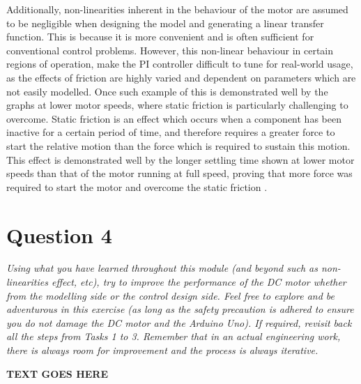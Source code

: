\documentclass[11pt, onecolumn]{article}
\begin{document}
\par Additionally, non-linearities inherent in the behaviour of the motor are assumed to be negligible when designing the model and generating a linear transfer function. This is because it is more convenient and is often sufficient for conventional control problems. However, this non-linear behaviour in certain regions of operation, make the PI controller difficult to tune for real-world usage, as the effects of friction are highly varied and dependent on parameters which are not easily modelled. Once such example of this is demonstrated well by the graphs at lower motor speeds, where static friction is particularly challenging to overcome. Static friction is an effect which occurs when a component has been inactive for a certain period of time, and therefore requires a greater force to start the relative motion than the force which is required to sustain this motion. This effect is demonstrated well by the longer settling time shown at lower motor speeds than that of the motor running at full speed, proving that more force was required to start the motor and overcome the static friction \cite{ijsrpStudyNonlinear}.
\section*{Question 4}
\par \textit{Using what you have learned throughout this module (and beyond such as non- linearities effect, etc), try to improve the performance of the DC motor whether from the modelling side or the control design side. Feel free to explore and be adventurous in this exercise (as long as the safety precaution is adhered to ensure you do not damage the DC motor and the Arduino Uno). If required, revisit back all the steps from Tasks 1 to 3. Remember that in an actual engineering work, there is always room for improvement and the process is always iterative.}
\noindent\makebox[\linewidth]{\rule{\textwidth}{0.4pt}}
\par \textbf{TEXT GOES HERE}


\end{document}
